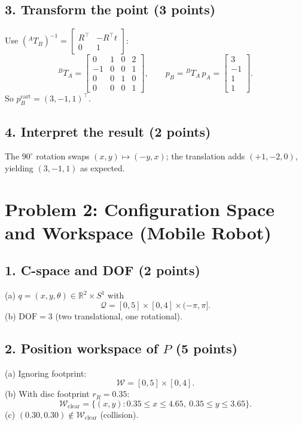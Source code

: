 \documentclass[11pt]{article}
\begin{document}
\subsection*{3. Transform the point (3 points)}
Use $(^{A}\!T_{B})^{-1}=\begin{bmatrix}R^\top&-R^\top t\\ 0&1\end{bmatrix}$:
\[
^{B}\!T_{A}=
\begin{bmatrix}
0 & 1 & 0 & 2\\
-1 & 0 & 0 & 1\\
0 & 0 & 1 & 0\\
0 & 0 & 0 & 1
\end{bmatrix},\qquad
p_B = {}^{B}\!T_{A}\,p_A =
\begin{bmatrix} 3\\ -1\\ 1\\ 1\end{bmatrix}.
\]
So $p_B^{\text{cart}}=(3,-1,1)^\top$.

\subsection*{4. Interpret the result (2 points)}
The $90^\circ$ rotation swaps $(x,y)\mapsto(-y,x)$; the translation adds $(+1,-2,0)$, yielding $(3,-1,1)$ as expected.

\section*{Problem 2: Configuration Space and Workspace (Mobile Robot)}

\subsection*{1. C-space and DOF (2 points)}
\noindent
(a) $q=(x,y,\theta)\in\mathbb{R}^2\times S^1$ with
\[
\mathcal{Q}=[0,5]\times[0,4]\times(-\pi,\pi].
\]
(b) $\mathrm{DOF}=3$ (two translational, one rotational).

\subsection*{2. Position workspace of $P$ (5 points)}
(a) Ignoring footprint:
\[
\mathcal{W}=[0,5]\times[0,4].
\]
(b) With disc footprint $r_R=0.35$:
\[
\mathcal{W}_{\text{clear}}=\{(x,y): 0.35\le x\le 4.65,\ 0.35\le y\le 3.65\}.
\]
(c) $(0.30,0.30)\notin\mathcal{W}_{\text{clear}}$ (collision).
\end{document}
